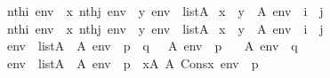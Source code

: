 \begin{isabelle}%
{\isasymlbrakk}nth{\isacharparenleft}{\kern0pt}i{\isacharcomma}{\kern0pt}\ env{\isacharparenright}{\kern0pt}\ {\isacharequal}{\kern0pt}\ x{\isacharsemicolon}{\kern0pt}\ nth{\isacharparenleft}{\kern0pt}j{\isacharcomma}{\kern0pt}\ env{\isacharparenright}{\kern0pt}\ {\isacharequal}{\kern0pt}\ y{\isacharsemicolon}{\kern0pt}\ env\ {\isasymin}\ list{\isacharparenleft}{\kern0pt}A{\isacharparenright}{\kern0pt}{\isasymrbrakk}\isanewline
{\isasymLongrightarrow}\ x\ {\isasymin}\ y\ {\isasymlongleftrightarrow}\ A{\isacharcomma}{\kern0pt}\ env\ {\isasymTurnstile}\ {\isasymcdot}i\ {\isasymin}\ j{\isasymcdot}\isasep\isanewline\isanewline%
{\isasymlbrakk}nth{\isacharparenleft}{\kern0pt}i{\isacharcomma}{\kern0pt}\ env{\isacharparenright}{\kern0pt}\ {\isacharequal}{\kern0pt}\ x{\isacharsemicolon}{\kern0pt}\ nth{\isacharparenleft}{\kern0pt}j{\isacharcomma}{\kern0pt}\ env{\isacharparenright}{\kern0pt}\ {\isacharequal}{\kern0pt}\ y{\isacharsemicolon}{\kern0pt}\ env\ {\isasymin}\ list{\isacharparenleft}{\kern0pt}A{\isacharparenright}{\kern0pt}{\isasymrbrakk}\isanewline
{\isasymLongrightarrow}\ x\ {\isacharequal}{\kern0pt}\ y\ {\isasymlongleftrightarrow}\ A{\isacharcomma}{\kern0pt}\ env\ {\isasymTurnstile}\ {\isasymcdot}i\ {\isacharequal}{\kern0pt}\ j{\isasymcdot}\isasep\isanewline\isanewline%
env\ {\isasymin}\ list{\isacharparenleft}{\kern0pt}A{\isacharparenright}{\kern0pt}\ {\isasymLongrightarrow}\ {\isacharparenleft}{\kern0pt}A{\isacharcomma}{\kern0pt}\ env\ {\isasymTurnstile}\ {\isasymcdot}{\isasymnot}{\isacharparenleft}{\kern0pt}p\ {\isasymand}\ q{\isacharparenright}{\kern0pt}{\isasymcdot}{\isacharparenright}{\kern0pt}\ {\isasymlongleftrightarrow}\ {\isasymnot}\ {\isacharparenleft}{\kern0pt}{\isacharparenleft}{\kern0pt}A{\isacharcomma}{\kern0pt}\ env\ {\isasymTurnstile}\ p{\isacharparenright}{\kern0pt}\ {\isasymand}\isanewline%
\ \ {\isacharparenleft}{\kern0pt}A{\isacharcomma}{\kern0pt}\ env\ {\isasymTurnstile}\ q{\isacharparenright}{\kern0pt}{\isacharparenright}{\kern0pt}\isasep\isanewline\isanewline%
env\ {\isasymin}\ list{\isacharparenleft}{\kern0pt}A{\isacharparenright}{\kern0pt}\ {\isasymLongrightarrow}\ {\isacharparenleft}{\kern0pt}A{\isacharcomma}{\kern0pt}\ env\ {\isasymTurnstile}\ {\isacharparenleft}{\kern0pt}{\isasymcdot}{\isasymforall}p{\isasymcdot}{\isacharparenright}{\kern0pt}{\isacharparenright}{\kern0pt}\ {\isasymlongleftrightarrow}\ {\isacharparenleft}{\kern0pt}{\isasymforall}x{\isasymin}A{\isachardot}{\kern0pt}\ A{\isacharcomma}{\kern0pt}\ Cons{\isacharparenleft}{\kern0pt}x{\isacharcomma}{\kern0pt}\ env{\isacharparenright}{\kern0pt}\ {\isasymTurnstile}\ p{\isacharparenright}{\kern0pt}%
\end{isabelle}%
